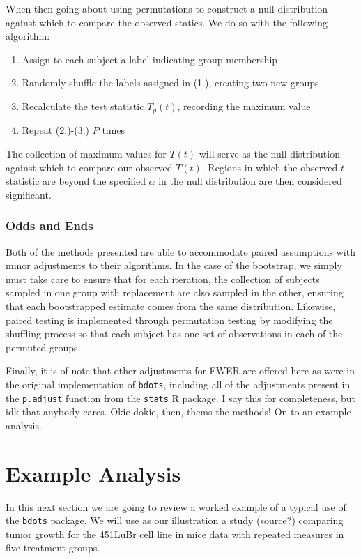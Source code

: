 \documentclass{article}
\newcommand{\xt}{\texttt}%
\begin{document}
When then going about using permutations to construct a null distribution against which to compare the observed statics. We do so with the following algorithm:

\begin{enumerate}
\item Assign to each subject a label indicating group membership
\item Randomly shuffle the labels assigned in (1.), creating two new groups 
\item Recalculate the test statistic $T_p(t)$, recording the maximum value
\item Repeat (2.)-(3.) $P$ times
\end{enumerate}

The collection of maximum values for $T(t)$ will serve as the null distribution against which to compare our observed $T(t)$. Regions in which the observed $t$ statistic are beyond the specified $\alpha$ in the null distribution are then considered significant.

\subsubsection{Odds and Ends}

Both of the methods presented are able to accommodate paired assumptions with minor adjustments to their algorithms. In the case of the bootstrap, we simply must take care to ensure that for each iteration, the collection of subjects sampled in one group with replacement are also sampled in the other, ensuring that each bootstrapped estimate comes from the same distribution. Likewise, paired testing is implemented through permutation testing by modifying the shuffling process so that each subject has one set of observations in each of the permuted groups.

Finally, it is of note that other adjustments for FWER are offered here as were in the original implementation of \xt{bdots}, including all of the adjustments present in the \xt{p.adjust} function from the \xt{stats} R package. I say this for completeness, but idk that anybody cares. Okie dokie, then, thems the methods! On to an example analysis.


\section{Example Analysis}

In this next section we are going to review a worked example of a typical use of the \xt{bdots} package. We will use as our illustration a study (source?) comparing tumor growth for the 451LuBr cell line in mice data with repeated measures in five treatment groups.
\end{document}
